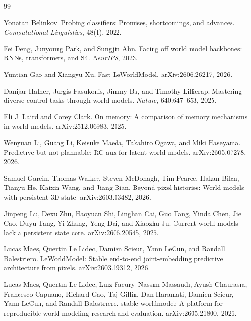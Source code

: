 \begin{thebibliography}{99}\small

Yonatan Belinkov.
\newblock Probing classifiers: Promises, shortcomings, and advances.
\newblock \emph{Computational Linguistics}, 48(1), 2022.

Fei Deng, Junyoung Park, and Sungjin Ahn.
\newblock Facing off world model backbones: RNNs, transformers, and S4.
\newblock \emph{NeurIPS}, 2023.

Yuntian Gao and Xiangyu Xu.
\newblock Fast LeWorldModel.
\newblock arXiv:2606.26217, 2026.

Danijar Hafner, Jurgis Pasukonis, Jimmy Ba, and Timothy Lillicrap.
\newblock Mastering diverse control tasks through world models.
\newblock \emph{Nature}, 640:647--653, 2025.

Eli J. Laird and Corey Clark.
\newblock On memory: A comparison of memory mechanisms in world models.
\newblock arXiv:2512.06983, 2025.

Wenyuan Li, Guang Li, Keisuke Maeda, Takahiro Ogawa, and Miki Haseyama.
\newblock Predictive but not plannable: RC-aux for latent world models.
\newblock arXiv:2605.07278, 2026.

Samuel Garcin, Thomas Walker, Steven McDonagh, Tim Pearce, Hakan Bilen, Tianyu He, Kaixin Wang, and Jiang Bian.
\newblock Beyond pixel histories: World models with persistent 3D state.
\newblock arXiv:2603.03482, 2026.

Jinpeng Lu, Dexu Zhu, Haoyuan Shi, Linghan Cai, Guo Tang, Yinda Chen, Jie Cao, Duyu Tang, Yi Zhang, Yong Dai, and Xiaozhu Ju.
\newblock Current world models lack a persistent state core.
\newblock arXiv:2606.20545, 2026.

Lucas Maes, Quentin Le Lidec, Damien Scieur, Yann LeCun, and Randall Balestriero.
\newblock LeWorldModel: Stable end-to-end joint-embedding predictive architecture from pixels.
\newblock arXiv:2603.19312, 2026.

Lucas Maes, Quentin Le Lidec, Luiz Facury, Nassim Massaudi, Ayush Chaurasia, Francesco Capuano, Richard Gao, Taj Gillin, Dan Haramati, Damien Scieur, Yann LeCun, and Randall Balestriero.
\newblock stable-worldmodel: A platform for reproducible world modeling research and evaluation.
\newblock arXiv:2605.21800, 2026.


\end{thebibliography}
